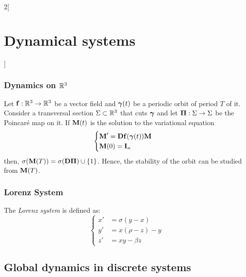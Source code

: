 \documentclass[../../../main_math.tex]{subfiles}
\begin{document}
\begin{multicols}{2}[\section{Dynamical systems}]
  \subsubsection{Dynamics on \texorpdfstring{$\mathbb{R}^3$}{R3}}
  \begin{proposition}
    Let $\boldsymbol{\mathrm{f}}:\mathbb{R}^3\rightarrow\mathbb{R}^3$ be a vector field and $\boldsymbol{\mathrm{\gamma}}(t)$ be a periodic orbit of period $T$ of it. Consider a transversal section $\Sigma\subset \mathbb{R}^3$ that cuts $\boldsymbol{\mathrm{\gamma}}$ and let $\boldsymbol{\mathrm{\Pi}}:\Sigma\rightarrow\Sigma$ be the Poincaré map on it. If $\boldsymbol{\mathrm{M}}(t)$ is the solution to the variational equation
    $$
      \begin{cases}
        \boldsymbol{\mathrm{M}}'      =\boldsymbol{\mathrm{D}}\boldsymbol{\mathrm{f}}(\boldsymbol{\mathrm{\gamma}}(t))\boldsymbol{\mathrm{M}} \\
        \boldsymbol{\mathrm{M}}(0)  =\boldsymbol{\mathrm{I}}_n
      \end{cases}
    $$
    then, $\sigma(\boldsymbol{\mathrm{M}}(T))=\sigma(\boldsymbol{\mathrm{D\Pi}})\cup\{1\}$. Hence, the stability of the orbit can be studied from $\boldsymbol{\mathrm{M}}(T)$.
  \end{proposition}
  \subsubsection{Lorenz System}
  \begin{definition}
    The \emph{Lorenz system} is defined as:
    $$
      \left\{
      \begin{aligned}
        x' & =\sigma(y-x)   \\
        y' & = x(\rho-z) -y \\
        z' & = xy -\beta z
      \end{aligned}
      \right.
    $$
  \end{definition}
  \subsection{Global dynamics in discrete systems}

\end{multicols}
\end{document}
